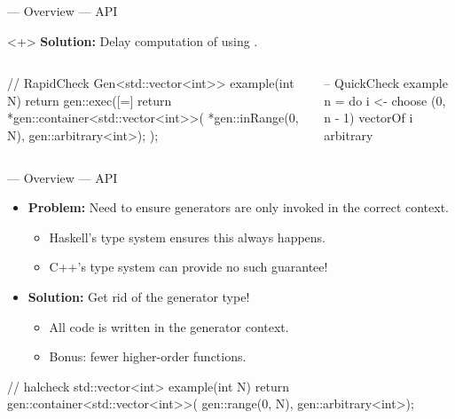 \begin{frame}[fragile,t]{\halcheck{} --- Overview --- API}
  \begin{onlyenv}<+>
    \textbf{Solution:} Delay computation of  using .

    \begin{columns}[T,onlytextwidth]
      \begin{cppcode}
        // RapidCheck
        Gen<std::vector<int>> example(int N) {
          return gen::exec([=] {
            return *gen::container<std::vector<int>>(
              *gen::inRange(0, N),
              gen::arbitrary<int>);
          });
        }
      \end{cppcode}

      \begin{haskellcode}
        -- QuickCheck
        example n = do
          i <- choose (0, n - 1)
          vectorOf i arbitrary
      \end{haskellcode}
    \end{columns}
  \end{onlyenv}
\end{frame}

\begin{frame}[fragile]{\halcheck{} --- Overview --- API}
  \begin{itemize}
    \item \textbf{Problem:} Need to ensure generators are only invoked in the correct context.
          \begin{itemize}
            \item Haskell's type system ensures this always happens.
            \item C++'s type system can provide no such guarantee!
          \end{itemize}
          \pause{}
    \item \textbf{Solution:} Get rid of the generator type!
          \begin{itemize}
            \item All code is written in the generator context.
            \item Bonus: fewer higher-order functions.
          \end{itemize}
  \end{itemize}

  \begin{cppcode}
    // halcheck
    std::vector<int> example(int N) {
      return gen::container<std::vector<int>>(
        gen::range(0, N),
        gen::arbitrary<int>);
    }
  \end{cppcode}
\end{frame}

